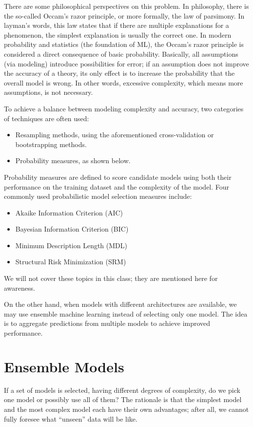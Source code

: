 \documentclass[12pt]{article}
\begin{document}
There are some philosophical perspectives on this problem. In philosophy, there is the so-called Occam's razor principle, or more formally, the law of parsimony. In layman's words, this law states that if there are multiple explanations for a phenomenon, the simplest explanation is usually the correct one. In modern probability and statistics (the foundation of ML), the Occam's razor principle is considered a direct consequence of basic probability. Basically, all assumptions (via modeling) introduce possibilities for error; if an assumption does not improve the accuracy of a theory, its only effect is to increase the probability that the overall model is wrong. In other words, excessive complexity, which means more assumptions, is not necessary.

To achieve a balance between modeling complexity and accuracy, two categories of techniques are often used:
\begin{itemize} 
    \item Resampling methods, using the aforementioned cross-validation or bootstrapping methods.
    \item Probability measures, as shown below.
\end{itemize}

Probability measures are defined to score candidate models using both their performance on the training dataset and the complexity of the model. Four commonly used probabilistic model selection measures include:
\begin{itemize}
    \item Akaike Information Criterion (AIC)
    \item Bayesian Information Criterion (BIC)
    \item Minimum Description Length (MDL)
    \item Structural Risk Minimization (SRM)
\end{itemize}
We will not cover these topics in this class; they are mentioned here for awareness.

On the other hand, when models with different architectures are available, we may use ensemble machine learning instead of selecting only one model. The idea is to aggregate predictions from multiple models to achieve improved performance. 

\section{Ensemble Models}
If a set of models is selected, having different degrees of complexity, do we pick one model or possibly use all of them? The rationale is that the simplest model and the most complex model each have their own advantages; after all, we cannot fully foresee what ``unseen'' data will be like.
\end{document}
